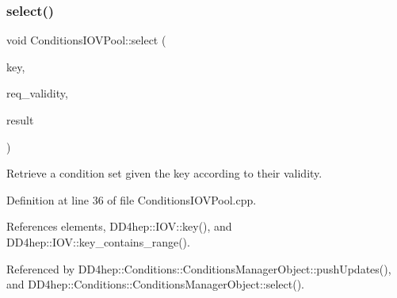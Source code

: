 \hypertarget{class_d_d4hep_1_1_conditions_1_1_conditions_i_o_v_pool_a75f43e7cd7cbc5c07afb0aca2b241a41}{}\label{class_d_d4hep_1_1_conditions_1_1_conditions_i_o_v_pool_a75f43e7cd7cbc5c07afb0aca2b241a41} 
\subsubsection{\texorpdfstring{select()}{select()}\hspace{0.1cm}{\footnotesize\ttfamily [1/2]}}
{\footnotesize\ttfamily void Conditions\+I\+O\+V\+Pool\+::select (\begin{DoxyParamCaption}\item[{\hyperlink{class_d_d4hep_1_1_conditions_1_1_condition_a7528efa762e8cc072ef80ea67c3531f9}{Condition\+::key\+\_\+type}}]{key,  }\item[{const \hyperlink{class_d_d4hep_1_1_conditions_1_1_condition_ad84300e226b2085ec5e9db7f47be5539}{Condition\+::iov\+\_\+type} \&}]{req\+\_\+validity,  }\item[{\hyperlink{namespace_d_d4hep_1_1_conditions_ae765f0140a33973a430280f02b6062f4}{Range\+Conditions} \&}]{result }\end{DoxyParamCaption})}



Retrieve a condition set given the key according to their validity. 



Definition at line 36 of file Conditions\+I\+O\+V\+Pool.\+cpp.



References elements, D\+D4hep\+::\+I\+O\+V\+::key(), and D\+D4hep\+::\+I\+O\+V\+::key\+\_\+contains\+\_\+range().



Referenced by D\+D4hep\+::\+Conditions\+::\+Conditions\+Manager\+Object\+::push\+Updates(), and D\+D4hep\+::\+Conditions\+::\+Conditions\+Manager\+Object\+::select().

\hypertarget{class_d_d4hep_1_1_conditions_1_1_conditions_i_o_v_pool_ae7ff2198bcdc12e8be275d1aacc5cd0b}{}\label{class_d_d4hep_1_1_conditions_1_1_conditions_i_o_v_pool_ae7ff2198bcdc12e8be275d1aacc5cd0b} 
